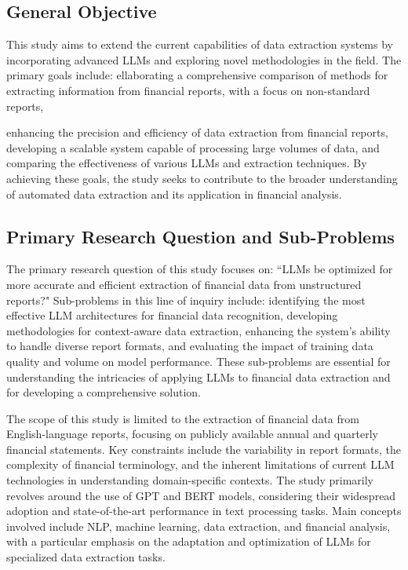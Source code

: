 \documentclass[english, 12pt, a4paper, elec, utf8, a-2b, online]{aaltothesis}
\begin{document}
\subsection{General Objective}

This study aims to extend the current capabilities of data extraction systems by incorporating advanced \ac{LLMs} and exploring novel methodologies in the field.
The primary goals include: ellaborating a comprehensive comparison of methods for extracting information from financial reports, with a focus on non-standard reports,

enhancing the precision and efficiency of data extraction from financial reports, developing a scalable system capable of processing large volumes of data, and comparing the effectiveness of various \ac{LLMs} and extraction techniques. By achieving these goals, the study seeks to contribute to the broader understanding of automated data extraction and its application in financial analysis.

\subsection{Primary Research Question and Sub-Problems}

The primary research question of this study focuses on: ``\ac{LLMs} be optimized for more accurate and efficient extraction of financial data from unstructured reports?" Sub-problems in this line of inquiry include: identifying the most effective LLM architectures for financial data recognition, developing methodologies for context-aware data extraction, enhancing the system's ability to handle diverse report formats, and evaluating the impact of training data quality and volume on model performance. These sub-problems are essential for understanding the intricacies of applying \ac{LLMs} to financial data extraction and for developing a comprehensive solution.


The scope of this study is limited to the extraction of financial data from English-language reports, focusing on publicly available annual and quarterly financial statements. Key constraints include the variability in report formats, the complexity of financial terminology, and the inherent limitations of current LLM technologies in understanding domain-specific contexts. The study primarily revolves around the use of GPT and BERT models, considering their widespread adoption and state-of-the-art performance in text processing tasks. Main concepts involved include \ac{NLP}, machine learning, data extraction, and financial analysis, with a particular emphasis on the adaptation and optimization of LLMs for specialized data extraction tasks.
\end{document}
